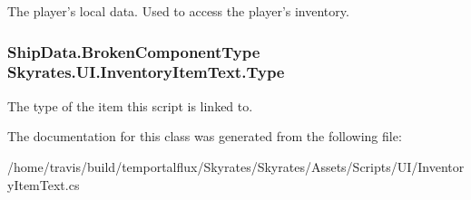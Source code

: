 The player's local data. Used to access the player's inventory. 

\hypertarget{class_skyrates_1_1_u_i_1_1_inventory_item_text_a926107c4f0a5d755960f835e663b7d9a}{
\subsubsection[{Type}]{\setlength{\rightskip}{0pt plus 5cm}Ship\-Data.\-Broken\-Component\-Type Skyrates.\-U\-I.\-Inventory\-Item\-Text.\-Type}}\label{class_skyrates_1_1_u_i_1_1_inventory_item_text_a926107c4f0a5d755960f835e663b7d9a}


The type of the item this script is linked to. 



The documentation for this class was generated from the following file\-:\begin{DoxyCompactItemize}
\item 
/home/travis/build/temportalflux/\-Skyrates/\-Skyrates/\-Assets/\-Scripts/\-U\-I/Inventory\-Item\-Text.\-cs\end{DoxyCompactItemize}
